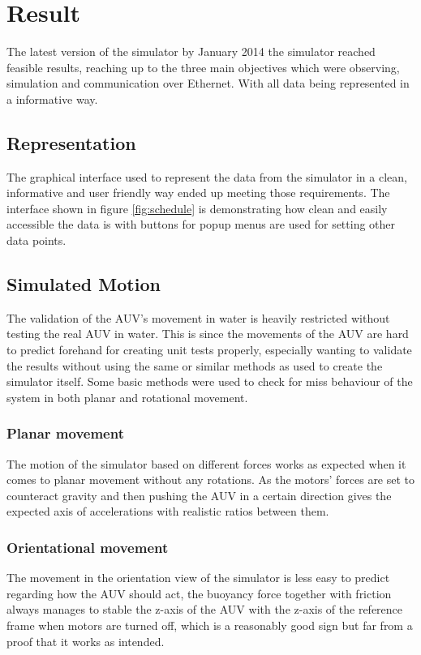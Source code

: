 \section{Result}\label{sec:result}

The latest version of the simulator by January 2014 the simulator reached feasible results, reaching up to the three main objectives which were observing, simulation and communication over Ethernet. With all data being represented in a informative way. 

\subsection{Representation}
The graphical interface used to represent the data from the simulator in a clean, informative and user friendly way ended up meeting those requirements. The interface shown in figure \ref{fig:schedule} is demonstrating how clean and easily accessible the data is with buttons for popup menus are used for setting other data points.

\subsection{Simulated Motion}
The validation of the AUV's movement in water is heavily restricted without testing the real AUV in water. This is since the movements of the AUV are hard to predict forehand for creating unit tests properly, especially wanting to validate the results without using the same or similar methods as used to create the simulator itself. Some basic methods were used to check for miss behaviour of the system in both planar and rotational movement.
\subsubsection{Planar movement}
The motion of the simulator based on different forces works as expected when it comes to planar movement without any rotations. As the motors' forces are set to counteract gravity and then pushing the AUV in a certain direction gives the expected axis of accelerations with realistic ratios between them.
\subsubsection{Orientational movement}
The movement in the orientation view of the simulator is less easy to predict regarding how the AUV should act, the buoyancy force together with friction always manages to stable the z-axis of the AUV with the z-axis of the reference frame when motors are turned off, which is a reasonably good sign but far from a proof that it works as intended.

